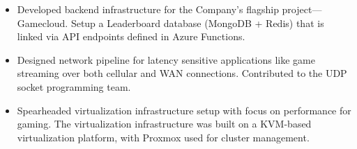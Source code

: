 \begin{itemize}
\item Developed backend infrastructure for the Company’s flagship project—Gamecloud. Setup a Leaderboard database (MongoDB + Redis) that is linked via API endpoints defined in Azure Functions.
\item Designed network pipeline for latency sensitive applications like game streaming over both cellular and WAN connections. Contributed to the UDP socket programming team. 
\item Spearheaded virtualization infrastructure setup with focus on performance for gaming. The virtualization infrastructure was built on a KVM-based virtualization platform, with Proxmox used for cluster management.

\end{itemize}